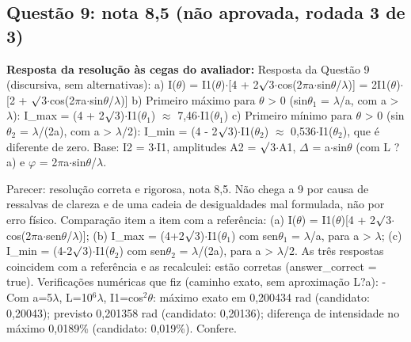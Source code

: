 \documentclass{article}%
\begin{document}
\subsection*{Questão 9: nota 8,5 (não aprovada, rodada 3 de 3)}%
\textbf{Resposta da resolução às cegas do avaliador:} Resposta da Questão 9 (discursiva, sem alternativas):\newline%
\newline%
a) I($\theta$) = I1($\theta$)$\cdot${[}4 + 2$\surd$3$\cdot$cos(2$\pi$a$\cdot$sin$\theta$/$\lambda$){]} = 2I1($\theta$)$\cdot${[}2 + $\surd$3$\cdot$cos(2$\pi$a$\cdot$sin$\theta$/$\lambda$){]}\newline%
\newline%
b) Primeiro máximo para $\theta$ > 0 (sin$\theta$$_{1}$ = $\lambda$/a, com a > $\lambda$): I\_max = (4 + 2$\surd$3)$\cdot$I1($\theta$$_{1}$) $\approx$ 7,46$\cdot$I1($\theta$$_{1}$)\newline%
\newline%
c) Primeiro mínimo para $\theta$ > 0 (sin$\theta$$_{2}$ = $\lambda$/(2a), com a > $\lambda$/2): I\_min = (4 - 2$\surd$3)$\cdot$I1($\theta$$_{2}$) $\approx$ 0,536$\cdot$I1($\theta$$_{2}$), que é diferente de zero.\newline%
\newline%
Base: I2 = 3$\cdot$I1, amplitudes A2 = $\surd$3$\cdot$A1, $\Delta$ = a$\cdot$sin$\theta$ (com L ? a) e $\varphi$ = 2$\pi$a$\cdot$sin$\theta$/$\lambda$.\par %
Parecer: resolução correta e rigorosa, nota 8,5. Não chega a 9 por causa de ressalvas de clareza e de uma cadeia de desigualdades mal formulada, não por erro físico.\newline%
\newline%
Comparação item a item com a referência: (a) I($\theta$) = I1($\theta$){[}4 + 2$\surd$3$\cdot$cos(2$\pi$a$\cdot$sen$\theta$/$\lambda$){]}; (b) I\_max = (4+2$\surd$3)$\cdot$I1($\theta$$_{1}$) com sen$\theta$$_{1}$ = $\lambda$/a, para a > $\lambda$; (c) I\_min = (4-2$\surd$3)$\cdot$I1($\theta$$_{2}$) com sen$\theta$$_{2}$ = $\lambda$/(2a), para a > $\lambda$/2. As três respostas coincidem com a referência e as recalculei: estão corretas (answer\_correct = true).\newline%
\newline%
Verificações numéricas que fiz (caminho exato, sem aproximação L?a):\newline%
{-} Com a=5$\lambda$, L=10$^{6}$$\lambda$, I1=cos$^2$$\theta$: máximo exato em 0,200434 rad (candidato: 0,20043); previsto 0,201358 rad (candidato: 0,20136); diferença de intensidade no máximo 0,0189\% (candidato: 0,019\%). Confere.\newline%
\end{document}
